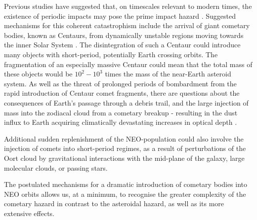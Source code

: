 Previous studies have suggested that, on timescales relevant to modern times, the existence of periodic impacts may pose the prime impact hazard \citep{ASHER19941}. Suggested mechanisms for this coherent catastrophism include the arrival of giant cometary bodies, known as Centaurs, from dynamically unstable regions moving towards the inner Solar System \citep{2015A&G....56f6.24N}. The disintegration of such a Centaur could introduce many objects with short-period, potentially Earth crossing orbits. The fragmentation of an especially massive Centaur could mean that the total mass of these objects would be $10^{2}-10^{3}$ times the mass of the near-Earth asteroid system. As well as the threat of prolonged periods of bombardment from the rapid introduction of Centaur comet fragments, there are questions about the consequences of Earth's passage through a debris trail, and the large injection of mass into the zodiacal cloud from a cometary breakup - resulting in the dust influx to Earth acquiring climatically devastating increases in optical depth \citep{2001MNRAS.321..463N, 2015MNRAS.448...27N}.

Additional sudden replenishment of the NEO-population could also involve the injection of comets into short-period regimes, as a result of perturbations of the Oort cloud by gravitational interactions with the mid-plane of the galaxy, large molecular clouds, or passing stars.

The postulated mechanisms for a dramatic introduction of cometary bodies into NEO orbits allows us, at a minimum, to recognise the greater complexity of the cometary hazard in contrast to the asteroidal hazard, as well as its more extensive effects.






